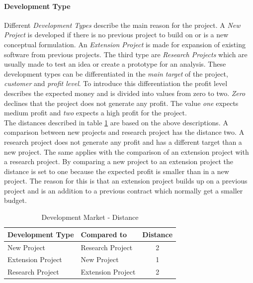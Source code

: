 \paragraph*{\textbf{Development Type}}
Different \textit{Development Types} describe the main reason for the project. A \textit{New Project} is developed if there is no previous project to build on or is a new conceptual formulation. An \textit{Extension Project} is made for expansion of existing software from previous projects. The third type are \textit{Research Projects} which are usually made to test an idea or create a prototype for an analysis. These development types can be differentiated in the \textit{main target} of the project, \textit{customer} and \textit{profit level}. To introduce this differentiation the profit level describes the expected money and is divided into values from zero to two. \textit{Zero} declines that the project does not generate any profit. The value \textit{one} expects medium profit and \textit{two} expects a high profit for the project.\\
The distances described in table \ref{property:devtype} are based on the above descriptions. A comparison between new projects and research project has the distance two. A research project does not generate any profit and has a different target than a new project. The same applies with the comparison of an extension project with a research project. By comparing a new project to an extension project the distance is set to one because the expected profit is smaller than in a new project. The reason for this is that an extension project builds up on a previous project and is an addition to a previous contract which normally get a smaller budget.\\
\begin{table}[h]
	\centering 
	\setlength{\tabcolsep}{4pt}
	\begin{tabular}{|l|l|c|}\hline
		Development Type		& Compared to 			&  Distance 	\\ \hline
		New Project   			& Research Project		& 2      		\\ \hline
		Extension Project   	& New Project 			& 1      		\\ \hline
		Research Project   		& Extension Project 	& 2     		\\ \hline
	\end{tabular} 
	\caption{Development Market - Distance} 
	\label{property:devtype} 
\end{table}
